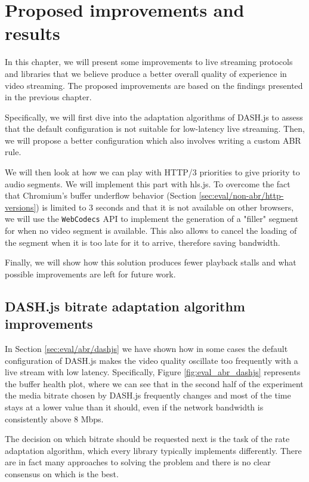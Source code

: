 \chapter{Proposed improvements and results}
\label{cha:improvements}

In this chapter, we will present some improvements to live streaming protocols and libraries that we believe produce a better overall quality of experience in video streaming. The proposed improvements are based on the findings presented in the previous chapter.

Specifically, we will first dive into the adaptation algorithms of DASH.js to assess that the default configuration is not suitable for low-latency live streaming. Then, we will propose a better configuration which also involves writing a custom ABR rule.

We will then look at how we can play with HTTP/3 priorities to give priority to audio segments. We will implement this part with hls.js. To overcome the fact that Chromium's buffer underflow behavior (Section \ref{sec:eval/non-abr/http-versions}) is limited to 3 seconds and that it is not available on other browsers, we will use the \texttt{WebCodecs} API to implement the generation of a "filler" segment for when no video segment is available. This also allows to cancel the loading of the segment when it is too late for it to arrive, therefore saving bandwidth.

Finally, we will show how this solution produces fewer playback stalls and what possible improvements are left for future work.

\section{DASH.js bitrate adaptation algorithm improvements}
\label{sec:improvements/dashjs}

In Section \ref{sec:eval/abr/dashjs} we have shown how in some cases the default configuration of DASH.js makes the video quality oscillate too frequently with a live stream with low latency. Specifically, Figure \ref{fig:eval_abr_dashjs} represents the buffer health plot, where we can see that in the second half of the experiment the media bitrate chosen by DASH.js frequently changes and most of the time stays at a lower value than it should, even if the network bandwidth is consistently above 8 Mbps.

The decision on which bitrate should be requested next is the task of the rate adaptation algorithm, which every library typically implements differently. There are in fact many approaches to solving the problem and there is no clear consensus on which is the best.

